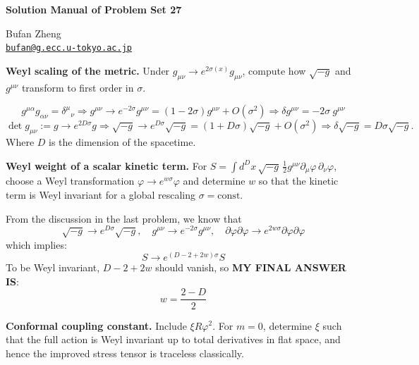 \resetproblem
\begin{center}
    {\LARGE \textbf{Solution Manual of Problem Set 27} \par}
    \vspace{1em}
    {\large Bufan Zheng\\ \href{mailto:bufan@g.ecc.u-tokyo.ac.jp}{\texttt{bufan@g.ecc.u-tokyo.ac.jp}} \par}
\end{center}

\begin{problem}
    \textbf{Weyl scaling of the metric.} Under \(g_{\mu\nu}\to e^{2\sigma(x)}g_{\mu\nu}\), compute how \(\sqrt{-g}\) and \(g^{\mu\nu}\) transform to first order in \(\sigma\).
\end{problem}
\begin{solution}[27.1]
	\[
	g^{\mu\alpha}g_{\alpha\nu}={\delta^\mu}_\nu\Rightarrow g^{\mu\nu}\to e^{-2\sigma}g^{\mu\nu}=\left(1-2\sigma\right)g^{\mu\nu}+O(\sigma^2)
	\Rightarrow \boxed{\delta g^{\mu\nu}=-2\sigma\mathrm{~}g^{\mu\nu}}
	\]
	\[
	\det g_{\mu\nu}:=g\to e^{2D\sigma}g\Rightarrow\sqrt{-g}\to e^{D\sigma}\sqrt{-g}=(1+D\sigma)\sqrt{-g}+O(\sigma^2)\Rightarrow\boxed{\delta\sqrt{-g}=D\sigma\sqrt{-g}.}
	\]
	Where $D$ is the dimension of the spacetime.
\end{solution}
\begin{problem}
    \textbf{Weyl weight of a scalar kinetic term.} For \(S=\int d^Dx\,\sqrt{-g}\,\frac{1}{2}g^{\mu\nu}\partial_\mu\varphi\,\partial_\nu\varphi\), choose a Weyl transformation \(\varphi\to e^{w\sigma}\varphi\) and determine \(w\) so that the kinetic term is Weyl invariant for a global rescaling \(\sigma=\text{const}\).
\end{problem}
\begin{solution}[27.2]
	From the discussion in the last problem, we know that
	\[
	\sqrt{-g}\rightarrow e^{D\sigma}\sqrt{-g},\quad g^{\mu\nu}\rightarrow e^{-2\sigma}g^{\mu\nu},\quad\partial\varphi\partial\varphi\rightarrow e^{2w\sigma}\partial\varphi\partial\varphi
	\]
	which implies:
	\[
	S\rightarrow e^{(D-2+2w)\sigma} S
	\]
	To be Weyl invariant, $D-2+2w$ should vanish, so \textbf{MY FINAL ANSWER IS}:
	\[
	\boxed{
	w=\frac{2-D}{2}
}
	\]
\end{solution}
\begin{problem}
    \textbf{Conformal coupling constant.} Include \(\xi R\varphi^2\). For \(m=0\), determine \(\xi\) such that the full action is Weyl invariant up to total derivatives in flat space, and hence the improved stress tensor is traceless classically.
\end{problem}
